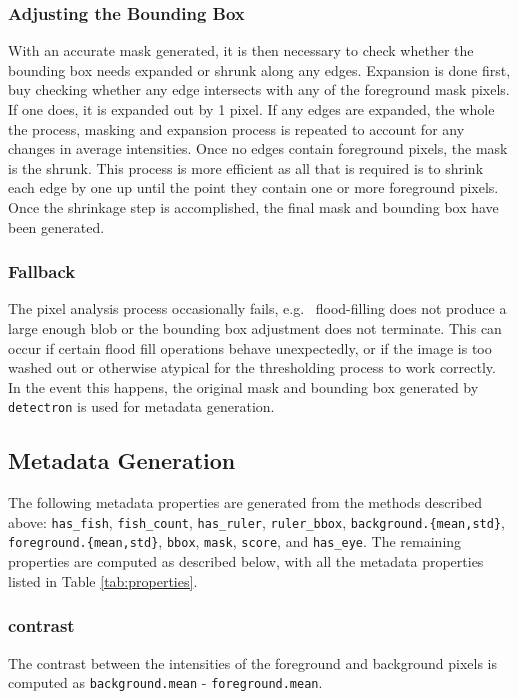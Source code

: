 \documentclass[conference]{IEEEtran}
\begin{document}
\subsubsection{Adjusting the Bounding Box}
With an accurate mask generated, it is then necessary to check whether the bounding box needs expanded or shrunk along any edges. Expansion is done first, buy checking whether any edge intersects with any of the foreground mask pixels. If one does, it is expanded out by 1 pixel. If any edges are expanded, the whole the process, masking and expansion process is repeated to account for any changes in average intensities. Once no edges contain foreground pixels, the mask is the shrunk. This process is more efficient as all that is required is to shrink each edge by one up until the point they contain one or more foreground pixels. Once the shrinkage step is accomplished, the final mask and bounding box have been generated.

\subsubsection{Fallback} The pixel analysis process occasionally fails,
e.g.~ flood-filling does not produce a large enough blob or
the bounding box adjustment does not terminate.
This can occur if certain flood fill operations behave unexpectedly, or if the image is too washed out or otherwise atypical for the thresholding process to work correctly. In the event this happens, the original mask and bounding box generated by \verb|detectron| is used for metadata generation.

\subsection{Metadata Generation}

The following metadata properties are generated from the methods
described above:
\verb|has_fish|, \verb|fish_count|, \verb|has_ruler|, \verb|ruler_bbox|, \verb|background.{mean,std}|, \verb|foreground.{mean,std}|, \verb|bbox|, \verb|mask|, \verb|score|, and \verb|has_eye|.
The remaining properties are computed as described below, with all the
metadata properties listed in Table \ref{tab:properties}.

\subsubsection{contrast}
The contrast between the intensities of the foreground and background
pixels is computed as \verb|background.mean| - \verb|foreground.mean|.
\end{document}
